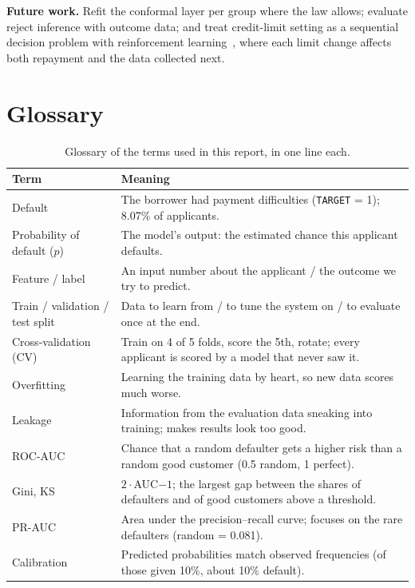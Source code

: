 \documentclass[conference,10pt]{IEEEtran}
\begin{document}
\textbf{Future work.} Refit the conformal layer per group where the law allows; evaluate reject
inference with outcome data; and treat credit-limit setting as a sequential decision problem with
reinforcement learning~\cite{sutton2018}, where each limit change affects both repayment and the
data collected next.




\clearpage
\onecolumn
\appendices
\section{Glossary}

\begin{table}[!ht]
\centering\small
\caption{Glossary of the terms used in this report, in one line each.}
\begin{tabular}{@{}lp{13.2cm}@{}}
\toprule
Term & Meaning \\
\midrule
Default & The borrower had payment difficulties (\texttt{TARGET} = 1); 8.07\% of applicants. \\
Probability of default ($p$) & The model's output: the estimated chance this applicant defaults. \\
Feature / label & An input number about the applicant / the outcome we try to predict. \\
Train / validation / test split & Data to learn from / to tune the system on / to evaluate once at the end. \\
Cross-validation (CV) & Train on 4 of 5 folds, score the 5th, rotate; every applicant is scored by a model that never saw it. \\
Overfitting & Learning the training data by heart, so new data scores much worse. \\
Leakage & Information from the evaluation data sneaking into training; makes results look too good. \\
ROC-AUC & Chance that a random defaulter gets a higher risk than a random good customer (0.5 random, 1 perfect). \\
Gini, KS & $2\cdot$AUC$-1$; the largest gap between the shares of defaulters and of good customers above a threshold. \\
PR-AUC & Area under the precision--recall curve; focuses on the rare defaulters (random = 0.081). \\
Calibration & Predicted probabilities match observed frequencies (of those given 10\%, about 10\% default). \\

\end{tabular}
\end{table}
\end{document}
